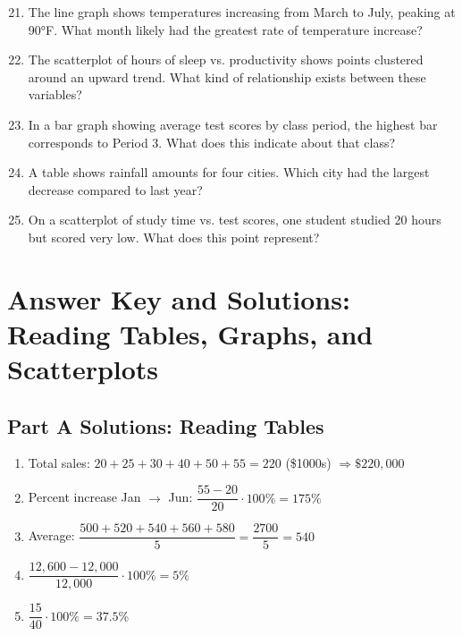 \documentclass[12pt]{article}
\begin{document}
\begin{enumerate}
  \setcounter{enumi}{20}
  \item The line graph shows temperatures increasing from March to July, peaking at 90°F. What month likely had the greatest rate of temperature increase?
  \item The scatterplot of hours of sleep vs. productivity shows points clustered around an upward trend. What kind of relationship exists between these variables?
  \item In a bar graph showing average test scores by class period, the highest bar corresponds to Period 3. What does this indicate about that class?
  \item A table shows rainfall amounts for four cities. Which city had the largest decrease compared to last year?
  \item On a scatterplot of study time vs. test scores, one student studied 20 hours but scored very low. What does this point represent?
\end{enumerate}

\newpage


\section*{Answer Key and Solutions: Reading Tables, Graphs, and Scatterplots}

\subsection*{Part A Solutions: Reading Tables}
\begin{enumerate}
  \item Total sales: \(20+25+30+40+50+55=220\) (\$1000s) \(\Rightarrow \boxed{\$220{,}000}\)
  \item Percent increase Jan \(\to\) Jun: \(\dfrac{55-20}{20}\cdot100\%=\boxed{175\%}\)
  \item Average: \(\dfrac{500+520+540+560+580}{5}=\dfrac{2700}{5}=\boxed{540}\)
  \item \(\dfrac{12{,}600-12{,}000}{12{,}000}\cdot100\%=\boxed{5\%}\)
  \item \(\dfrac{15}{40}\cdot100\%=\boxed{37.5\%}\)
\end{enumerate}
\end{document}

